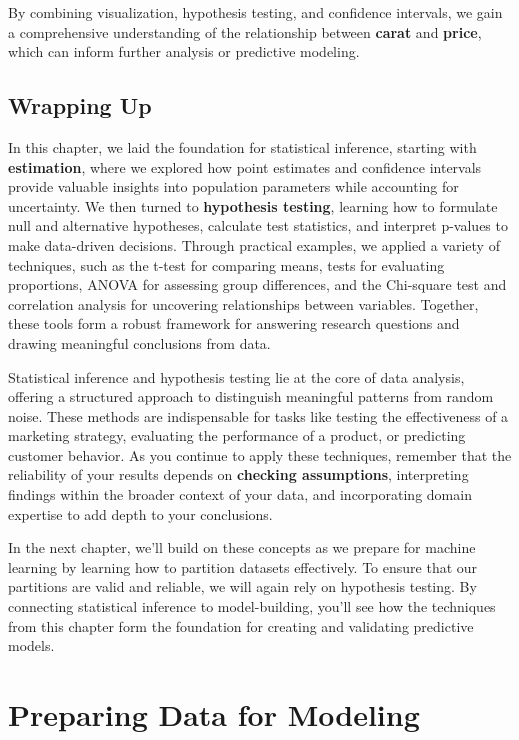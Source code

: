 \documentclass[
]{book}
\theoremstyle{definition}
\theoremstyle{definition}
\theoremstyle{definition}
\theoremstyle{definition}
\theoremstyle{remark}
\begin{document}
By combining visualization, hypothesis testing, and confidence intervals, we gain a comprehensive understanding of the relationship between \textbf{carat} and \textbf{price}, which can inform further analysis or predictive modeling.

\section{Wrapping Up}\label{wrapping-up}

In this chapter, we laid the foundation for statistical inference, starting with \textbf{estimation}, where we explored how point estimates and confidence intervals provide valuable insights into population parameters while accounting for uncertainty. We then turned to \textbf{hypothesis testing}, learning how to formulate null and alternative hypotheses, calculate test statistics, and interpret p-values to make data-driven decisions. Through practical examples, we applied a variety of techniques, such as the t-test for comparing means, tests for evaluating proportions, ANOVA for assessing group differences, and the Chi-square test and correlation analysis for uncovering relationships between variables. Together, these tools form a robust framework for answering research questions and drawing meaningful conclusions from data.

Statistical inference and hypothesis testing lie at the core of data analysis, offering a structured approach to distinguish meaningful patterns from random noise. These methods are indispensable for tasks like testing the effectiveness of a marketing strategy, evaluating the performance of a product, or predicting customer behavior. As you continue to apply these techniques, remember that the reliability of your results depends on \textbf{checking assumptions}, interpreting findings within the broader context of your data, and incorporating domain expertise to add depth to your conclusions.

In the next chapter, we'll build on these concepts as we prepare for machine learning by learning how to partition datasets effectively. To ensure that our partitions are valid and reliable, we will again rely on hypothesis testing. By connecting statistical inference to model-building, you'll see how the techniques from this chapter form the foundation for creating and validating predictive models.

\chapter{Preparing Data for Modeling}\label{chapter-modeling}
\end{document}
